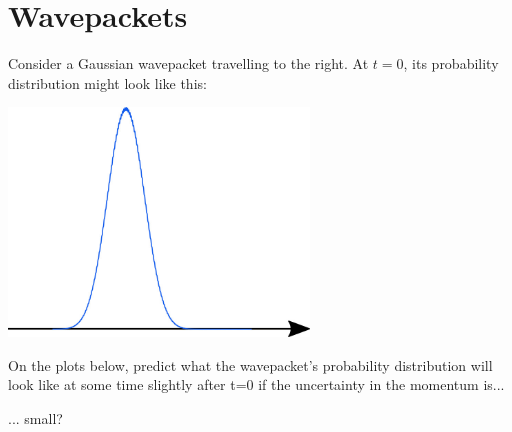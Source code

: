 \section*{Wavepackets}

\begin{questions}
\question Consider a Gaussian wavepacket travelling to the right. At $t=0$, its probability distribution might look like this:

	\vspace{0.1in}
	\centerline{\includegraphics[width=0.6\textwidth]{includes/wavepackets-FIGURES/gaussian.jpg}}
	\vspace{0.1in} 
 

	\vspace{0.1in}
		\question On the plots below, predict what the wavepacket's probability distribution will look like at some time slightly after t=0 if the uncertainty in the momentum is...

	\vspace{0.2in}
	\begin{minipage}{0.5\textwidth}
		\centerline{... small?}\vspace{0.1in}
		

\end{minipage}
\end{questions}

